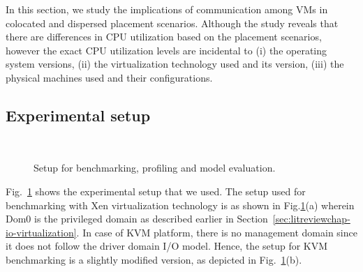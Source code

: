 In this section, we study the implications of 
communication among VMs in colocated and dispersed 
placement scenarios. 
Although the study reveals that there are differences in CPU
utilization based on the placement scenarios, however the exact
CPU utilization levels are incidental to (i) the operating system
versions, (ii) the virtualization technology used and its version,
(iii) the physical machines used and their configurations.


\subsection{Experimental setup}
\label{sec:arescue-setup}

\begin{figure}[t]
\centering
{} 
~~~~~~~~~~~~~~~~~~~~
\caption{Setup for benchmarking, profiling and model evaluation.}
\label{fig:setup}
\end{figure}
Fig.~\ref{fig:setup} shows the experimental setup that we used. 
The setup used for benchmarking with Xen virtualization technology
is as shown in Fig.\ref{fig:setup}(a) wherein Dom0 is the privileged
domain as described earlier in Section~\ref{sec:litreviewchap-io-virtualization}. 
In case of KVM platform, 
there is no management domain since it
does not follow the driver domain I/O model. Hence, the setup
for KVM benchmarking is a slightly modified version, as
depicted in Fig.~\ref{fig:setup}(b).

